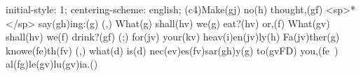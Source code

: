 initial-style: 1;
centering-scheme: english;
(c4)Make(gj) no(h) thought,(gf) <sp>*</sp> say(gh)ing:(g) (,) What(g) shall(hv) we(g) eat?(hv) or,(f) What(gv) shall(hv) we(f) drink?(gf) (;) for(jv) your(kv) heav(i)en(jv)ly(h) Fa(jv)ther(g) knowe(fe)th(fv) (,) what(d) is(d) nec(ev)es(fv)sar(gh)y(g) to(gvFD) you,(fe~) al(fg)le(gv)lu(gv)ia.()
